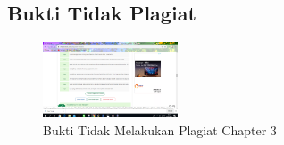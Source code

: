 \subsection{Bukti Tidak Plagiat}
\begin{figure}[H]
\centering
	\includegraphics[width=4cm]{figures/1174003/3/Plagiat.PNG}
	\caption{Bukti Tidak Melakukan Plagiat Chapter 3}
\end{figure}
